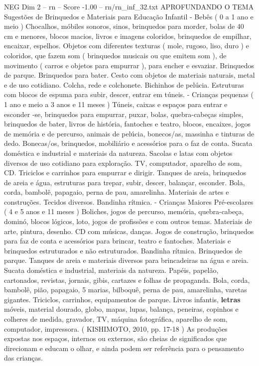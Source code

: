 \begin{textsample}{NEG Dim 2 – rn – Score -1.00 – rn/rn\_inf\_32.txt}  \label{ex:f2_neg_048}
APROFUNDANDO O TEMA Sugestões de Brinquedos e Materiais para Educação Infantil - Bebês ( 0 a 1 ano e meio ) Chocalhos, móbiles sonoros, sinos, brinquedos para morder, bolas de 40 cm e menores, blocos macios, livros e imagens coloridos, brinquedos de empilhar, encaixar, espelhos.
Objetos com diferentes texturas ( mole, rugoso, liso, duro ) e coloridos, que fazem som ( brinquedos musicais ou que emitem som ), de movimento ( carros e objetos para empurrar ), para encher e esvaziar.
Brinquedos de parque.
Brinquedos para bater.
Cesto com objetos de materiais naturais, metal e de uso cotidiano.
Colcha, rede e colchonete.
Bichinhos de pelúcia.
Estruturas com blocos de espuma para subir, descer, entrar em túneis. - Crianças pequenas ( 1 ano e meio a 3 anos e 11 meses ) Túneis, caixas e espaços para entrar e esconder -se, brinquedos para empurrar, puxar, bolas, quebra-cabeças simples, brinquedos de bater, livros de história, fantoches e teatro, blocos, encaixes, jogos de memória e de percurso, animais de pelúcia, bonecos/as, massinha e tinturas de dedo.
Bonecas/os, brinquedos, mobiliário e acessórios para o faz de conta.
Sucata doméstica e industrial e materiais da natureza.
Sacolas e latas com objetos diversos de uso cotidiano para exploração.
TV, computador, aparelho de som, CD.
Triciclos e carrinhos para empurrar e dirigir.
Tanques de areia, brinquedos de areia e água, estruturas para trepar, subir, descer, balançar, esconder.
Bola, corda, bambolê, papagaio, perna de pau, amarelinha.
Materiais de artes e construções.
Tecidos diversos.
Bandinha rítmica. - Crianças Maiores Pré-escolares ( 4 e 5 anos e 11 meses ) Boliches, jogos de percurso, memória, quebra-cabeça, dominó, blocos lógicos, loto, jogos de profissões e com outros temas.
Materiais de arte, pintura, desenho.
CD com músicas, danças.
Jogos de construção, brinquedos para faz de conta e acessórios para brincar, teatro e fantoches.
Materiais e brinquedos estruturados e não estruturados.
Bandinha rítmica.
Brinquedos de parque.
Tanques de areia e materiais diversos para brincadeiras na água e areia.
Sucata doméstica e industrial, materiais da natureza.
Papéis, papelão, cartonados, revistas, jornais, gibis, cartazes e folhas de propaganda.
Bola, corda, bambolê, pião, papagaio, 5 marias, bilboquê, perna de pau, amarelinha, varetas gigantes.
Triciclos, carrinhos, equipamentos de parque.
Livros infantis, \textbf{letras} móveis, material dourado, globo, mapas, lupas, balança, peneiras, copinhos e colheres de medida, gravador, TV, máquina fotográfica, aparelho de som, computador, impressora. ( KISHIMOTO, 2010, pp. 17-18 ) As produções expostas nos espaços, internos ou externos, são cheias de significados que direcionam e educam o olhar, e ainda podem ser referência para o pensamento das crianças.

\end{textsample}
